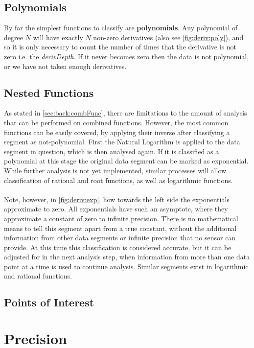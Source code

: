 \documentclass[main.tex]{subfiles}
\begin{document}
    \subsection{Polynomials}
    
      By far the simplest functions to classify are \textbf{polynomials}. Any polynomial of degree $N$ will have exactly $N$ non-zero derivatives (also see \cref{fig:deriv:poly}), and so it is only necessary to count the number of times that the derivative is not zero i.e. the \textit{derivDepth}. If it never becomes zero then the data is not polynomial, or we have not taken enough derivatives.
    
    \subsection{Nested Functions}
      
      As stated in \cref{sec:back:combFunc}, there are limitations to the amount of analysis that can be performed on combined functions. However, the most common functions can be easily covered, by applying their inverse after classifying a segment as not-polynomial. First the Natural Logarithm is applied to the data segment in question, which is then analysed again. If it is classified as a polynomial at this stage the original data segment can be marked as exponential. While further analysis is not yet implemented, similar processes will allow classification of rational and root functions, as well as logarithmic functions.
      \\\\
      Note, however, in \cref{fig:deriv:exp}, how towards the left side the exponentials approximate to zero. All exponentials have such an asymptote, where they approximate a constant of zero to infinite precision. There is no mathematical means to tell this segment apart from a true constant, without the additional information from other data segments or infinite precision that no sensor can provide. At this time this classification is considered accurate, but it can be adjusted for in the next analysis step, when information from more than one data point at a time is used to continue analysis. Similar segments exist in logarithmic and rational functions.
      
    \subsection{Points of Interest}
      
      
      
  \section{Precision}
  

  
  
\end{document}
